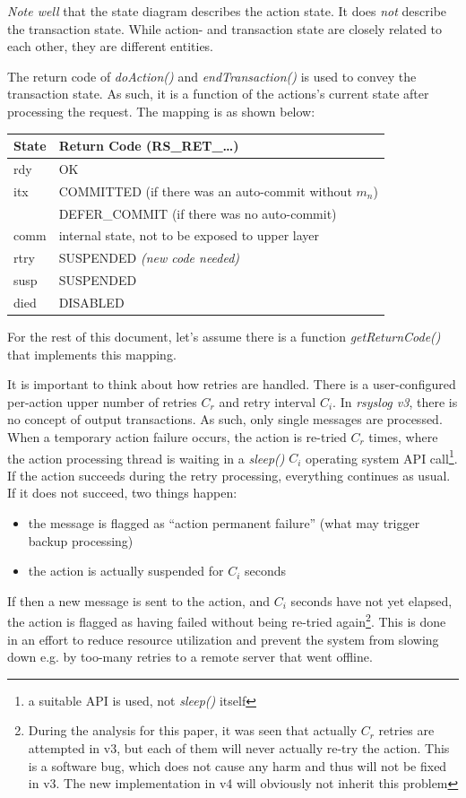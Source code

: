 \documentclass[a4paper,10pt]{article}
\begin{document}
\emph{Note well} that the state diagram describes the action state. It does \emph{not} describe the transaction state. While action- and transaction state are closely related to each other, they are different entities.

The return code of \emph{doAction()} and \emph{endTransaction()} is used to convey the transaction state. As such, it is a function of the actions's current state after processing the request. The mapping is as shown below:

\begin{center}
\begin{tabular}{|l|l|} \hline
	State		& Return Code (RS\_RET\_\ldots)\\\hline
	rdy 		& OK \\
	itx		& COMMITTED (if there was an auto-commit without $m_n$)\\
			& DEFER\_COMMIT (if there was no auto-commit)\\
	comm		& internal state, not to be exposed to upper layer \\
	rtry		& SUSPENDED \emph{(new code needed)} \\
	susp		& SUSPENDED \\
	died		& DISABLED \\\hline
\end{tabular}
\end{center}

For the rest of this document, let's assume there is a function \emph{getReturnCode()} that implements this mapping.

It is important to think about how retries are handled. There is a user-configured per-action upper number of retries $C_r$ and retry interval $C_i$. In \emph{rsyslog v3}, there is no concept of output transactions. As such, only single messages are processed. When a temporary action failure occurs, the action is re-tried $C_r$ times, where the action processing thread is waiting in a \emph{sleep()} $C_i$ operating system API call\footnote{a suitable API is used, not \emph{sleep()} itself}. If the action succeeds during the retry processing, everything continues as usual. If it does not succeed, two things happen:
\begin{itemize}
\item the message is flagged as ``action permanent failure'' (what may trigger backup processing)
\item the action is actually suspended for $C_i$ seconds
\end{itemize}
If then a new message is sent to the action, and $C_i$ seconds have not yet elapsed, the action is flagged as having failed without being re-tried again\footnote{During the analysis for this paper, it was seen that actually $C_r$ retries are attempted in v3, but each of them will never actually re-try the action. This is a software bug, which does not cause any harm and thus will not be fixed in v3. The new implementation in v4 will obviously not inherit this problem}. This is done in an effort to reduce resource utilization and prevent the system from slowing down e.g. by too-many retries to a remote server that went offline.
\end{document}
